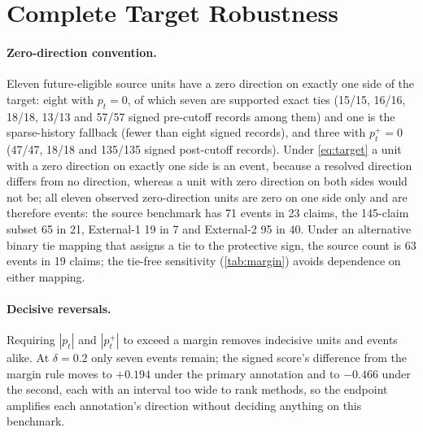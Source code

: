 \documentclass[11pt]{article}
\begin{document}
\begin{table}[!t]\centering\footnotesize
\setlength{\tabcolsep}{3pt}
\caption{Events under the exchangeable controls for every annotation (null mean [95\% range];
reimplementation, 1{,}000 draws per null). The archived primary values of \cref{tab:astra7} are 35.3 and 36.1.}
\label{tab:nullann}
\end{table}

\section{Complete Target Robustness}
\label{app:robust}
\paragraph{Zero-direction convention.} Eleven future-eligible source units have a zero direction on
exactly one side of the target: eight with $p_t=0$, of which seven are supported exact ties (15/15,
16/16, 18/18, 13/13 and 57/57 signed pre-cutoff records among them) and one is the sparse-history
fallback (fewer than eight signed records), and three with $p^{+}_t=0$ (47/47, 18/18 and 135/135 signed post-cutoff
records). Under \cref{eq:target} a unit with a zero direction on exactly one side is an event, because a resolved
direction differs from no direction, whereas a unit with zero direction on both sides would not be; all eleven
observed zero-direction units are zero on one side only and are therefore events: the source benchmark has 71 events in 23 claims, the 145-claim subset 65 in 21, External-1 19 in 7 and External-2 95 in 40. Under an alternative binary tie mapping
that assigns a tie to the protective sign, the source count is 63 events in 19 claims; the tie-free
sensitivity (\cref{tab:margin}) avoids dependence on either mapping.

\paragraph{Decisive reversals.} Requiring $|p_t|$ and $|p^{+}_t|$ to exceed a margin removes
indecisive units and events alike. At $\delta=0.2$ only seven events remain; the signed score's
difference from the margin rule moves to $+0.194$ under the primary annotation and to $-0.466$ under
the second, each with an interval too wide to rank methods, so the endpoint amplifies each
annotation's direction without deciding anything on this benchmark.
\end{document}
